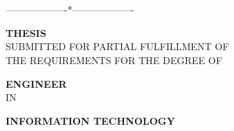 \begin{titlepage}
	\thispagestyle{empty}
	\vspace{-20pt}
	\begin{center}
		\fontsize{14}{16}\selectfont
		\MakeUppercase{\universityTitle}\\
		\MakeUppercase{\schoolName}\\
		-------------------*------------------- \\
		\vspace{100pt}

		\fontsize{26}{28}\selectfont
		\MakeUppercase{\textbf{Thesis}}\\
		\vspace{10pt}
		\fontsize{14}{16}\selectfont
		\MakeUppercase{Submitted for partial fulfillment of}\\
		\MakeUppercase{the requirements for the degree of}\\
		
		\vspace{4pt}

		\fontsize{26}{28}\selectfont
		\MakeUppercase{\textbf{Engineer}}\\
		\vspace{10pt}
		\fontsize{14}{16}\selectfont
		\MakeUppercase{IN}\\
		\vspace{10pt}

		\fontsize{22}{24}\selectfont
		\MakeUppercase{\textbf{Information Technology}}\\

		\vspace{40pt}

		\begin{minipage}{0.96\linewidth}
			\begin{center}
			\fontsize{22}{22}\selectfont
			\MakeUppercase{\textbf{\thesisTitle}}\\
			\end{center}
		\end{minipage}


\end{center}
\end{titlepage}
